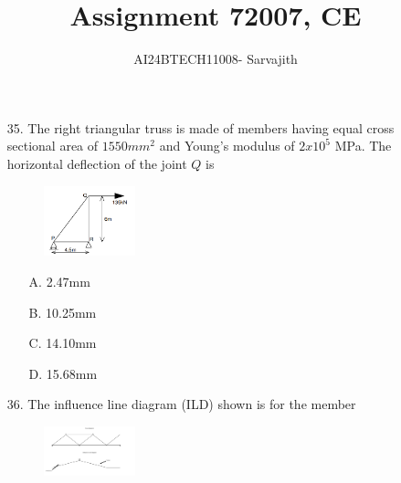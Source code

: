 \documentclass[journal]{IEEEtran}
\begin{document}

\vspace{3cm}


\author{AI24BTECH11008- Sarvajith
}
\title{Assignment 7}
{\let\newpage\relax\maketitle}
\title{2007, CE}
\renewcommand{\thefigure}{\theenumi}
\renewcommand{\thetable}{\theenumi}
\setlength{\intextsep}{10pt} %
\renewcommand{\thetable}{\theenumi}
\begin{enumerate}
  \item[35.]The right triangular truss is made of members having equal cross sectional area of
  $1550 mm^2$ and Young's modulus of $2 x 10^5$ MPa. The horizontal deflection of the
  joint $Q$ is 
  \begin{figure}[h!]
    \centering
    \includegraphics[width=0.25\textwidth]{figs/Fig_1.png}  %
    \label{fig:sample1}
\end{figure}
  \begin{enumerate}
    \item [A.] 2.47mm
    \item [B.] 10.25mm
    \item [C.] 14.10mm
    \item [D.] 15.68mm
  \end{enumerate}
  \item[36.] The influence line diagram (ILD) shown is for the member
  \item[]  \begin{figure}[h!]
    \centering
    \includegraphics[width=0.25\textwidth]{figs/Fig_2.png}  %
    \label{fig:sample2}

\end{figure}
\end{enumerate}
\end{document}
